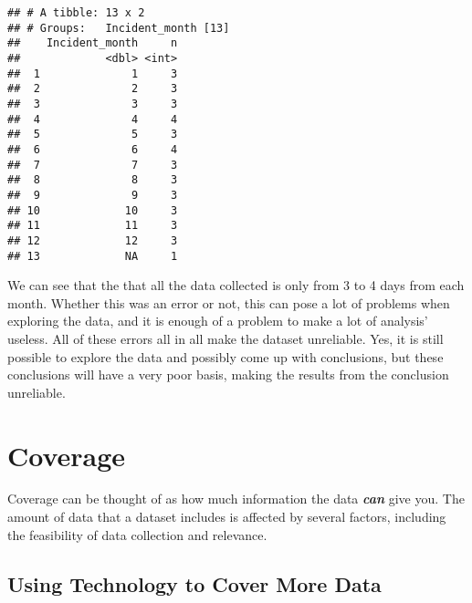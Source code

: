 \documentclass[
]{book}
\newenvironment{Shaded}{\begin{snugshade}}{\end{snugshade}}
\newcommand{\DataTypeTok}[1]{\textcolor[rgb]{0.13,0.29,0.53}{#1}}
\newcommand{\KeywordTok}[1]{\textcolor[rgb]{0.13,0.29,0.53}{\textbf{#1}}}
\newcommand{\NormalTok}[1]{#1}
\newcommand{\OperatorTok}[1]{\textcolor[rgb]{0.81,0.36,0.00}{\textbf{#1}}}
\newcommand{\StringTok}[1]{\textcolor[rgb]{0.31,0.60,0.02}{#1}}
\begin{document}
\begin{Shaded}
\end{Shaded}

\begin{verbatim}
## # A tibble: 13 x 2
## # Groups:   Incident_month [13]
##    Incident_month     n
##             <dbl> <int>
##  1              1     3
##  2              2     3
##  3              3     3
##  4              4     4
##  5              5     3
##  6              6     4
##  7              7     3
##  8              8     3
##  9              9     3
## 10             10     3
## 11             11     3
## 12             12     3
## 13             NA     1
\end{verbatim}

We can see that the that all the data collected is only from 3 to 4 days from each month. Whether this was an error or not, this can pose a lot of problems when exploring the data, and it is enough of a problem to make a lot of analysis' useless. All of these errors all in all make the dataset unreliable. Yes, it is still possible to explore the data and possibly come up with conclusions, but these conclusions will have a very poor basis, making the results from the conclusion unreliable.

\hypertarget{coverage}{%
\section{Coverage}\label{coverage}}

Coverage can be thought of as how much information the data \textbf{\emph{can}} give you. The amount of data that a dataset includes is affected by several factors, including the feasibility of data collection and relevance.

\hypertarget{using-technology-to-cover-more-data}{%
\subsection{Using Technology to Cover More Data}\label{using-technology-to-cover-more-data}}
\end{document}
